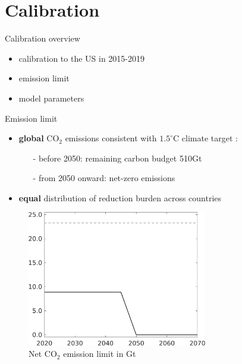 \documentclass[11pt,aspectratio=169]{beamer}
\begin{document}
\hypertarget{calback}{}
\section{Calibration}
\begin{frame}{Calibration overview}
	\begin{itemize}
		\item
		calibration to the US in 2015-2019
		\item emission limit
		\item model parameters
	\end{itemize}
\end{frame}

\begin{frame}{Emission limit}
	\vspace{-1mm}
	\begin{itemize}
		\item<+->  \textbf{global} CO$_2$ emissions consistent with $1.5^\circ$C climate target \footnotesize{\citep{IPCC2022}}\normalsize:
		\vspace{1mm}
		\begin{itemize}
			\item[-] before 2050: remaining carbon budget 510Gt
			\item[-] from 2050 onward: net-zero  emissions
		\end{itemize}
		\vspace{0mm}
		\item<+-> \textbf{equal} distribution of  reduction burden across countries %
	\end{itemize}
	\vspace{-2mm}
	\pause
	\begin{center}
		\begin{minipage}{0.6\textwidth}
			\begin{figure}
				\caption{Net CO$_2$ emission limit in Gt}
				\includegraphics[width=0.7\textwidth]{../codding_model/own_basedOnFried/optimalPol_010922_revision/figures/all_13Sept22_Tplus30/Emnet_goals_o0_lgd0.png}

\end{figure}
\end{minipage}
\end{center}
\end{frame}
\end{document}
